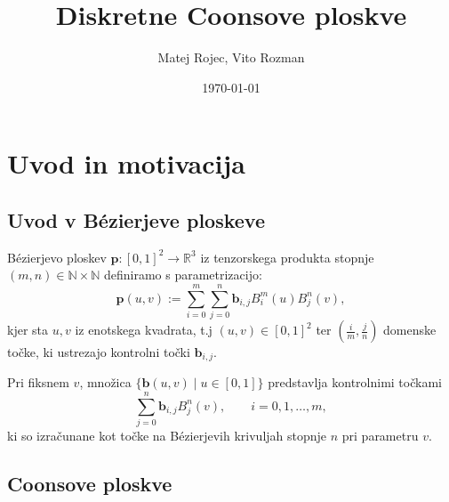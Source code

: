\documentclass[a4paper,12pt]{article}
\begin{document}
\newcommand{\N}{\mathbb{N}}
\newcommand{\R}{\mathbb{R}}


\title{Diskretne Coonsove ploskve}
\author{Matej Rojec, Vito Rozman}
\date{\today}

\maketitle


\newpage

\tableofcontents
\listoffigures

\newpage

\section{Uvod in motivacija}

\subsection{Uvod v Bézierjeve ploskeve}
Bézierjevo ploskev $\mathbf{p} : [0,1]^2 \rightarrow \R^3$ iz tenzorskega produkta stopnje $(m, n) \in \N \times \N$  
definiramo s parametrizacijo:
$$\mathbf{p}(u,v) := \sum_{i=0}^m \sum_{j=0}^n \mathbf{b}_{i,j} B_i^m(u)B_j^n(v),$$
kjer sta $u,v$ iz enotskega kvadrata, t.j $(u,v) \in [0,1]^2$ ter $(\frac{i}{m}, \frac{j}{n})$
domenske točke, ki ustrezajo kontrolni točki $\mathbf{b}_{i,j}$.

Pri fiksnem $v$, množica $\{\mathbf{b} (u,v) \mid u \in [0,1]  \}$ predstavlja 
kontrolnimi točkami
$$\sum_{j=0}^n \mathbf{b}_{i,j} B_j^n(v), \qquad i=0,1,\ldots,m,$$
ki so izračunane kot točke na Bézierjevih krivuljah stopnje $n$ pri parametru $v$.


\subsection{Coonsove ploskve}
\end{document}
